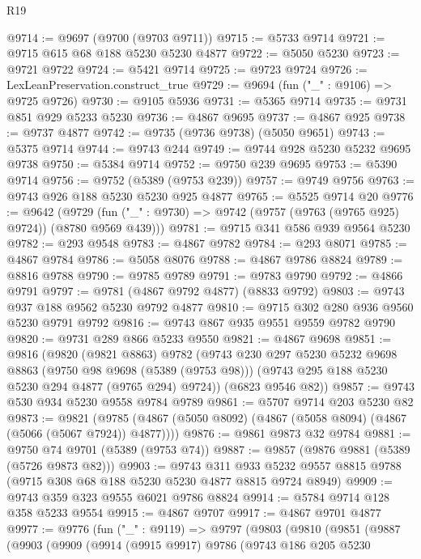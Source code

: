 \begin{lexlean}{R19}
\begin{coremodule}
@9714 := @9697 (@9700 (@9703 @9711))
@9715 := @5733 @9714
@9721 := @9715 @615 @68 @188 @5230 @5230 @4877
@9722 := @5050 @5230
@9723 := @9721 @9722
@9724 := @5421 @9714
@9725 := @9723 @9724
@9726 := LexLeanPreservation.construct_true
@9729 := @9694 (fun ("_" : @9106) => @9725 @9726)
@9730 := @9105 @5936
@9731 := @5365 @9714
@9735 := @9731 @851 @929 @5233 @5230
@9736 := @4867 @9695
@9737 := @4867 @925
@9738 := @9737 @4877
@9742 := @9735 (@9736 @9738) (@5050 @9651)
@9743 := @5375 @9714
@9744 := @9743 @244
@9749 := @9744 @928 @5230 @5232 @9695 @9738
@9750 := @5384 @9714
@9752 := @9750 @239 @9695
@9753 := @5390 @9714
@9756 := @9752 (@5389 (@9753 @239))
@9757 := @9749 @9756
@9763 := @9743 @926 @188 @5230 @5230 @925 @4877
@9765 := @5525 @9714 @20
@9776 := @9642
    (@9729 (fun ("_" : @9730) => @9742 (@9757 (@9763 (@9765 @925) @9724)) (@8780 @9569 @439)))
@9781 := @9715 @341 @586 @939 @9564 @5230
@9782 := @293 @9548
@9783 := @4867 @9782
@9784 := @293 @8071
@9785 := @4867 @9784
@9786 := @5058 @8076
@9788 := @4867 @9786 @8824
@9789 := @8816 @9788
@9790 := @9785 @9789
@9791 := @9783 @9790
@9792 := @4866 @9791
@9797 := @9781 (@4867 @9792 @4877) (@8833 @9792)
@9803 := @9743 @937 @188 @9562 @5230 @9792 @4877
@9810 := @9715 @302 @280 @936 @9560 @5230 @9791 @9792
@9816 := @9743 @867 @935 @9551 @9559 @9782 @9790
@9820 := @9731 @289 @866 @5233 @9550
@9821 := @4867 @9698
@9851 := @9816
    (@9820
      (@9821 @8863)
      @9782
      (@9743
        @230
        @297
        @5230
        @5232
        @9698
        @8863
        (@9750 @98 @9698 (@5389 (@9753 @98)))
        (@9743 @295 @188 @5230 @5230 @294 @4877 (@9765 @294) @9724))
      (@6823 @9546 @82))
@9857 := @9743 @530 @934 @5230 @9558 @9784 @9789
@9861 := @5707 @9714 @203 @5230 @82
@9873 := @9821
    (@9785 (@4867 (@5050 @8092) (@4867 (@5058 @8094) (@4867 (@5066 (@5067 @7924)) @4877))))
@9876 := @9861 @9873 @32 @9784
@9881 := @9750 @74 @9701 (@5389 (@9753 @74))
@9887 := @9857 (@9876 @9881 (@5389 (@5726 @9873 @82)))
@9903 := @9743
    @311
    @933
    @5232
    @9557
    @8815
    @9788
    (@9715 @308 @68 @188 @5230 @5230 @4877 @8815 @9724 @8949)
@9909 := @9743 @359 @323 @9555 @6021 @9786 @8824
@9914 := @5784 @9714 @128 @358 @5233 @9554
@9915 := @4867 @9707
@9917 := @4867 @9701 @4877
@9977 := @9776
    (fun ("_" : @9119) =>
    @9797
      (@9803
        (@9810
          (@9851
            (@9887
              (@9903
                (@9909
                  (@9914
                    (@9915 @9917)
                    @9786
                    (@9743
                      @186
                      @205
                      @5230

\end{coremodule}
\end{lexlean}
